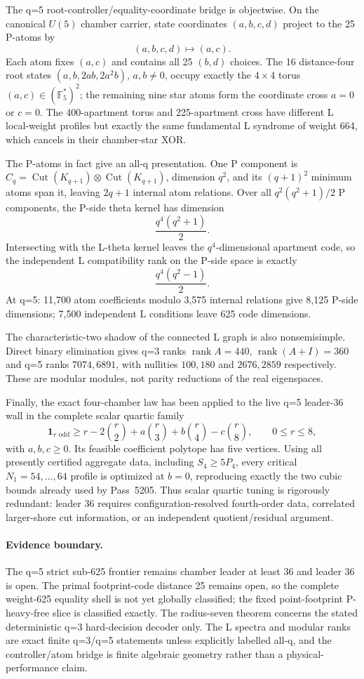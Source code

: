 The q=5 root-controller/equality-coordinate bridge is objectwise.  On the canonical $U(5)$ chamber carrier, state coordinates $(a,b,c,d)$ project to the 25 P-atoms by
\[
(a,b,c,d)\longmapsto(a,c).
\]
Each atom fixes $(a,c)$ and contains all 25 $(b,d)$ choices.  The 16 distance-four root states $(a,b,2ab,2a^2b)$, $a,b\ne0$, occupy exactly the $4\times4$ torus $(a,c)\in(\mathbb F_5^*)^2$; the remaining nine star atoms form the coordinate cross $a=0$ or $c=0$.  The 400-apartment torus and 225-apartment cross have different L local-weight profiles but exactly the same fundamental L syndrome of weight 664, which cancels in their chamber-star XOR.

The P-atoms in fact give an all-q presentation.  One P component is $C_q=\operatorname{Cut}(K_{q+1})\otimes\operatorname{Cut}(K_{q+1})$, dimension $q^2$, and its $(q+1)^2$ minimum atoms span it, leaving $2q+1$ internal atom relations.  Over all $q^2(q^2+1)/2$ P components, the P-side theta kernel has dimension
\[
\frac{q^4(q^2+1)}2.
\]
Intersecting with the L-theta kernel leaves the $q^4$-dimensional apartment code, so the independent L compatibility rank on the P-side space is exactly
\[
\boxed{\frac{q^4(q^2-1)}2}.
\]
At q=5: 11,700 atom coefficients modulo 3,575 internal relations give 8,125 P-side dimensions; 7,500 independent L conditions leave 625 code dimensions.

The characteristic-two shadow of the connected L graph is also nonsemisimple.  Direct binary elimination gives q=3 ranks $\operatorname{rank}A=440$, $\operatorname{rank}(A+I)=360$ and q=5 ranks $7074,6891$, with nullities $100,180$ and $2676,2859$ respectively.  These are modular modules, not parity reductions of the real eigenspaces.

Finally, the exact four-chamber law has been applied to the live q=5 leader-36 wall in the complete scalar quartic family
\[
\mathbf 1_{r\text{ odd}}\ge r-2\binom r2+a\binom r3+b\binom r4-c\binom r8,
\qquad 0\le r\le8,
\]
with $a,b,c\ge0$.  Its feasible coefficient polytope has five vertices.  Using all presently certified aggregate data, including $S_4\ge5P_4$, every critical $N_1=54,\ldots,64$ profile is optimized at $b=0$, reproducing exactly the two cubic bounds already used by Pass~5205.  Thus scalar quartic tuning is rigorously redundant: leader 36 requires configuration-resolved fourth-order data, correlated larger-shore cut information, or an independent quotient/residual argument.

\paragraph{Evidence boundary.}
The q=5 strict sub-625 frontier remains chamber leader at least 36 and leader 36 is open.  The primal footprint-code distance 25 remains open, so the complete weight-625 equality shell is not yet globally classified; the fixed point-footprint P-heavy-free slice is classified exactly.  The radius-seven theorem concerns the stated deterministic q=3 hard-decision decoder only.  The L spectra and modular ranks are exact finite q=3/q=5 statements unless explicitly labelled all-q, and the controller/atom bridge is finite algebraic geometry rather than a physical-performance claim.
\fi
